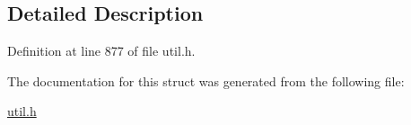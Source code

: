 \subsection{Detailed Description}


Definition at line 877 of file util.\+h.



The documentation for this struct was generated from the following file\+:\begin{DoxyCompactItemize}
\item 
\hyperlink{util_8h}{util.\+h}\end{DoxyCompactItemize}
